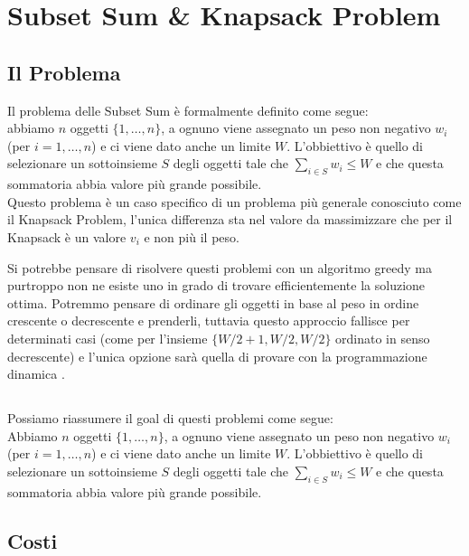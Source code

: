 \section{Subset Sum \& Knapsack Problem }

\subsection{Il Problema}

Il problema delle Subset Sum è formalmente definito come segue:\\

\- abbiamo $n$ oggetti $\{1, \ldots, n\}$, a ognuno viene assegnato un
peso non negativo $w_i$ (per $i = 1, \ldots, n$) e ci viene dato anche un
limite $W$. L'obbiettivo è quello di selezionare un sottoinsieme $S$ degli
oggetti tale che $\sum_{i \in S}w_i \leq W$ e che questa sommatoria abbia valore
più grande possibile.\\

Questo problema è un caso specifico di un problema più generale conosciuto come
il Knapsack Problem, l'unica differenza sta nel valore da massimizzare che per il
Knapsack è un valore $v_i$ e non più il peso.

Si potrebbe pensare di risolvere questi problemi con un algoritmo greedy ma
purtroppo non ne esiste uno in grado di trovare efficientemente la soluzione ottima.
Potremmo pensare di ordinare gli oggetti in base al peso in ordine crescente o
decrescente e prenderli, tuttavia questo approccio fallisce per determinati casi
(come per l'insieme $\{W/2+1, W/2, W/2\}$ ordinato in senso decrescente) e l'unica
opzione sarà quella di provare con la programmazione dinamica .
\newpage

\subsection{\goal}

Possiamo riassumere il goal di questi problemi come segue:\\

\- Abbiamo $n$ oggetti $\{1, \ldots, n\}$, a ognuno viene assegnato un
peso non negativo $w_i$ (per $i = 1, \ldots, n$) e ci viene dato anche un
limite $W$. L'obbiettivo è quello di selezionare un sottoinsieme $S$ degli oggetti
tale che $\sum_{i \in S}w_i \leq W$ e che questa sommatoria abbia valore più
grande possibile.

\subsection{Costi}

